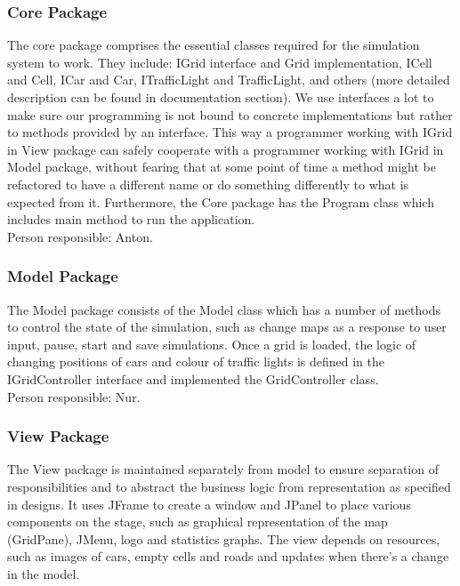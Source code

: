 \documentclass{article}
\begin{document}
	\subsubsection{Core Package}
	The core package comprises the essential classes required for the simulation system to work. They include: IGrid interface and Grid implementation, ICell and Cell, ICar and Car, ITrafficLight and TrafficLight, and others (more detailed description can be found in documentation section). 
	We use interfaces a lot to make sure our programming is not bound to concrete implementations but rather to methods provided by an interface. 
	This way a programmer working with IGrid in View package can safely cooperate with a programmer working with IGrid in Model package, without fearing that at some point of time a method might be refactored to have a different name or do something differently to what is expected from it. 
	Furthermore, the Core package has the Program class which includes main method to run the application.\\
	
	\noindent
	Person responsible: Anton. 

\subsubsection{Model Package}
The Model package consists of the Model class which has a number of methods to control the state of the simulation, such as change maps as a response to user input, pause, start and save simulations. 
Once a grid is loaded, the logic of changing positions of cars and colour of traffic lights is defined in the IGridController interface and implemented the GridController class.\\

\noindent
Person responsible: Nur. 

\subsubsection{View Package}
The View package is maintained separately from model to ensure separation of responsibilities and to abstract the business logic from representation as specified in designs. 
It uses JFrame to create a window and JPanel to place various components on the stage, such as graphical representation of the map (GridPane), JMenu, logo and statistics graphs. 
The view depends on resources, such as images of cars, empty cells and roads and updates when there’s a change in the model.\\
\end{document}
